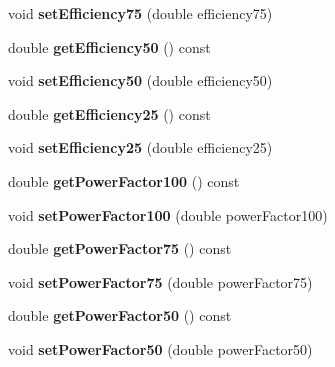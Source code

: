 \begin{DoxyCompactItemize}
\mbox{\label{class_motor_data_afccbaa43b470f6576647851cc9d356d6}} 
void {\bfseries set\+Efficiency75} (double efficiency75)
\item 
\mbox{\label{class_motor_data_a07d861b745f8d2a09c8e7540a6fe65ed}} 
double {\bfseries get\+Efficiency50} () const
\item 
\mbox{\label{class_motor_data_aad6febd24d17e5f9cfc829666cb3c3a2}} 
void {\bfseries set\+Efficiency50} (double efficiency50)
\item 
\mbox{\label{class_motor_data_a9da44e426e9a386a5d16e1ccffa3f8a1}} 
double {\bfseries get\+Efficiency25} () const
\item 
\mbox{\label{class_motor_data_a89d6e254b34ba81f80b756bb51cd66f6}} 
void {\bfseries set\+Efficiency25} (double efficiency25)
\item 
\mbox{\label{class_motor_data_a250e44c87517fe1ac4b127db48b07300}} 
double {\bfseries get\+Power\+Factor100} () const
\item 
\mbox{\label{class_motor_data_a8bbfc74cd323a44ea8aa5453e3cd4895}} 
void {\bfseries set\+Power\+Factor100} (double power\+Factor100)
\item 
\mbox{\label{class_motor_data_a47bd751614504069a1cc0792be5f6105}} 
double {\bfseries get\+Power\+Factor75} () const
\item 
\mbox{\label{class_motor_data_a8cb9fb1696d9d28ad65f7d1e27128d7f}} 
void {\bfseries set\+Power\+Factor75} (double power\+Factor75)
\item 
\mbox{\label{class_motor_data_ac154d54db217e67590e9fdc4ec40b628}} 
double {\bfseries get\+Power\+Factor50} () const
\item 
\mbox{\label{class_motor_data_a9fa35a7a40a0f9b96d1d9dad8dcf9a43}} 
void {\bfseries set\+Power\+Factor50} (double power\+Factor50)
\item 
\mbox{\label{class_motor_data_acf9931c536b579c9f8700411e74456db}} 

\end{DoxyCompactItemize}
